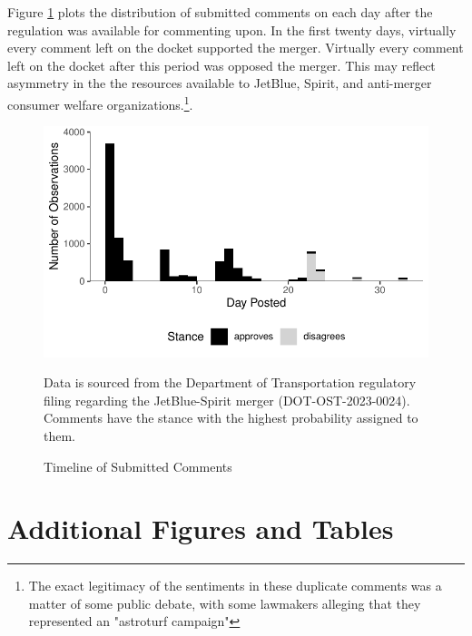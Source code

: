\documentclass{article}
\begin{document}
\begin{appendices}
Figure \ref{fig:CommentTimeline} plots the distribution of submitted comments on each day after the regulation was available for commenting upon. In the first twenty days, virtually every comment left on the docket supported the merger. Virtually every comment left on the docket after this period was opposed the merger. This may reflect asymmetry in the the resources available to JetBlue, Spirit, and anti-merger consumer welfare organizations.\footnote{The exact legitimacy of the sentiments in these duplicate comments was a matter of some public debate, with some lawmakers alleging that they represented an "astroturf campaign"\citep{birnbaum_elizabeth_2023}}.  

    \begin{figure}[h]
		\caption{Timeline of Submitted Comments}
		\label{fig:CommentTimeline}
		\includegraphics{stance_submission_timeline}
		\begin{minipage}{\textwidth} 
			{\footnotesize Data is sourced from the Department of Transportation regulatory filing regarding the JetBlue-Spirit merger  (DOT-OST-2023-0024). Comments have the stance with the highest probability assigned to them.} 
		\end{minipage}
	\end{figure}
	
	
	

	\FloatBarrier
	\pagebreak
	\section{Additional Figures and Tables}	
	
	

\end{appendices}
\end{document}
